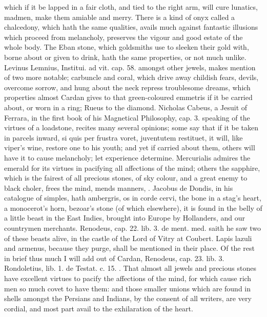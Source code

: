 {which if it be lapped in a fair cloth, and tied to the right arm,
will cure lunatics, madmen, make them amiable and merry.
There is a kind of onyx called a chalcedony, which hath the same
qualities, avails much against fantastic illusions which proceed
from melancholy, preserves the vigour and good estate of the whole
body.
The Eban stone, which goldsmiths use to sleeken their gold with, borne
about or given to drink, hath the same properties, or not much
unlike.
Levinus Lemnius, Institui. ad vit. cap. 58. amongst other jewels, makes
mention of two more notable; carbuncle and coral, which drive
away childish fears, devils, overcome sorrow, and hung about the neck
repress troublesome dreams, which properties almost Cardan gives to
that green-coloured emmetris if it be carried about, or worn in a
ring; Rueus to the diamond.
Nicholas Cabeus, a Jesuit of Ferrara, in the first book of his
Magnetical Philosophy, cap. 3. speaking of the virtues of a loadstone,
recites many several opinions; some say that if it be taken in parcels
inward, si quis per frustra voret, juventutem restituet, it will, like
viper's wine, restore one to his youth; and yet if carried about them,
others will have it to cause melancholy; let experience determine.
Mercurialis admires the emerald for its virtues in pacifying all
affections of the mind; others the sapphire, which is the fairest
of all precious stones, of sky colour, and a great enemy to black
choler, frees the mind, mends manners, \etc{}. Jacobus de Dondis, in his
catalogue of simples, hath ambergris, os in corde cervi, the bone
in a stag's heart, a monocerot's horn, bezoar's stone (of which
elsewhere), it is found in the belly of a little beast in the East
Indies, brought into Europe by Hollanders, and our countrymen
merchants. Renodeus, cap. 22. lib. 3. de ment. med. saith he saw two of
these beasts alive, in the castle of the Lord of Vitry at Coubert.
Lapis lazuli and armenus, because they purge, shall be mentioned in
their place.
Of the rest in brief thus much I will add out of Cardan, Renodeus, cap.
23. lib. 3. Rondoletius, lib. 1. de Testat. c. 15. \etc{}. That
almost all jewels and precious stones have excellent virtues to pacify
the affections of the mind, for which cause rich men so much covet to
have them: and those smaller unions which are found in shells
amongst the Persians and Indians, by the consent of all writers, are
very cordial, and most part avail to the exhilaration of the heart.
}
